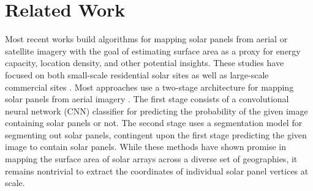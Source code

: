 \section{Related Work}
Most recent works build algorithms for mapping solar panels from aerial or satellite imagery \citep{DeepSolar, SegNet, MujtabaAndWani, GolovkoEtAl} with the goal of estimating surface area as a proxy for energy capacity, location density, and other potential insights. These studies have focused on both small-scale residential solar sites \citep{CrossNets, SolarDK} as well as large-scale commercial sites \citep{DeepSolar}. Most approaches use a two-stage architecture for mapping solar panels from aerial imagery \citep{SolarNet, HyperionSolarNet}. The first stage consists of a convolutional neural network (CNN) classifier for predicting the probability of the given image containing solar panels or not. The second stage uses a segmentation model for segmenting out solar panels, contingent upon the first stage predicting the given image to contain solar panels. While these methods have shown promise in mapping the surface area of solar arrays across a diverse set of geographies, it remains nontrivial to extract the coordinates of individual solar panel vertices at scale. 